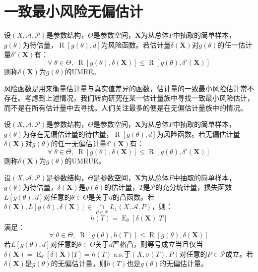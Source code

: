 \section{一致最小风险无偏估计}

\begin{definition}
	设$(X,\mathscr{A},\mathscr{P})$是参数结构，$\Theta$是参数空间，$\mathbf{X}$为从总体$F$中抽取的简单样本，$g(\theta)$为待估量，$\operatorname{R}[g(\theta),d]$为风险函数。若估计量$\delta(\mathbf{X})$对$g(\theta)$的任一估计量$\delta'(\mathbf{X})$有：
	\begin{equation*}
		\forall\;\theta\in\Theta,\;\operatorname{R}[g(\theta),\delta(\mathbf{X})]\leqslant\operatorname{R}[g(\theta),\delta'(\mathbf{X})]
	\end{equation*}
	则称$\delta(\mathbf{X})$为$g(\theta)$的\gls{UMRE}。
\end{definition}
\begin{note}
	风险函数是用来衡量估计量与真实值差异的函数，估计量的一致最小风险估计常不存在。考虑到上述情况，我们转向研究在某一估计量族中寻找一致最小风险估计，而不是在所有估计量中去寻找。人们关注最多的便是在无偏估计量族中的情况。
\end{note}
\begin{definition}
	设$(X,\mathscr{A},\mathscr{P})$是参数结构，$\Theta$是参数空间，$\mathbf{X}$为从总体$F$中抽取的简单样本，$g(\theta)$为存在无偏估计量的待估量，$\operatorname{R}[g(\theta),d]$为风险函数。若无偏估计量$\delta(\mathbf{X})$对$g(\theta)$的任一无偏估计量$\delta'(\mathbf{X})$有：
	\begin{equation*}
		\forall\;\theta\in\Theta,\;\operatorname{R}[g(\theta),\delta(\mathbf{X})]\leqslant\operatorname{R}[g(\theta),\delta'(\mathbf{X})]
	\end{equation*}
	则称$\delta(\mathbf{X})$为$g(\theta)$的\gls{UMRUE}。
\end{definition}
\begin{theorem}
	\label{theo:Rao-Blackwell}
	设$(X,\mathscr{A},\mathscr{P})$是参数结构，$\Theta$是参数空间，$\mathbf{X}$为从总体$F$中抽取的简单样本，$g(\theta)$为待估量，$\delta(\mathbf{X})$是$g(\theta)$的估计量，$T$是$\mathscr{P}$的充分统计量，损失函数$L[g(\theta),d]$对任意的$\theta\in\Theta$是关于$d$的凸函数。若$\delta(\mathbf{X}),L[g(\theta),\delta(\mathbf{X})]\in\underset{P\in\mathscr{P}}{\cap}L_1(X,\mathscr{A},P)$，则：
	\begin{equation*}
		h(T)=\operatorname{E}_{\theta}[\delta(\mathbf{X})|T]
	\end{equation*}
	满足：
	\begin{equation*}
		\forall\;\theta\in\Theta,\;\operatorname{R}[g(\theta),h(T)]\leqslant\operatorname{R}[g(\theta),\delta(\mathbf{X})]
	\end{equation*}
	若$L[g(\theta),d]$对任意的$\theta\in\Theta$关于$d$严格凸，则等号成立当且仅当$\delta(\mathbf{X})=\operatorname{E}_{\theta}[\delta(\mathbf{X})|T]=h(T)\;$a.s.于$(X,\sigma(T),P)$对任意的$P\in\mathscr{P}$成立。若$\delta(\mathbf{X})$是$g(\theta)$的无偏估计量，则$h(T)$也是$g(\theta)$的无偏估计量。
\end{theorem}
